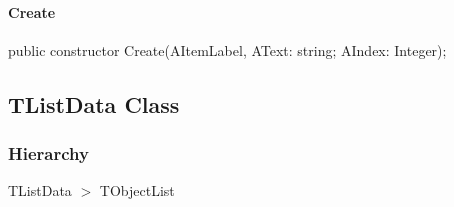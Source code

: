 \documentclass{report}
\newif\ifpdf
\begin{document}
\paragraph*{Create}\hspace*{\fill}

\label{PasDoc_Gen.TListItemData-Create}
\begin{list}{}{
\setlength{\itemindent}{0cm}
\setlength{\listparindent}{0cm}
\setlength{\leftmargin}{\evensidemargin}
\addtolength{\leftmargin}{\tmplength}
\settowidth{\labelsep}{X}
\addtolength{\leftmargin}{\labelsep}
\setlength{\labelwidth}{\tmplength}
}
\item[\textbf{Declaration}\hfill]
\ifpdf
\begin{flushleft}
\fi
\begin{ttfamily}
public constructor Create(AItemLabel, AText: string; AIndex: Integer);\end{ttfamily}

\ifpdf
\end{flushleft}
\fi

\end{list}
\ifpdf
\subsection*{\large{\textbf{TListData Class}}\normalsize\hspace{1ex}\hrulefill}
\else
\subsection*{TListData Class}
\fi
\label{PasDoc_Gen.TListData}
\subsubsection*{\large{\textbf{Hierarchy}}\normalsize\hspace{1ex}\hfill}
TListData {$>$} TObjectList
\end{document}
